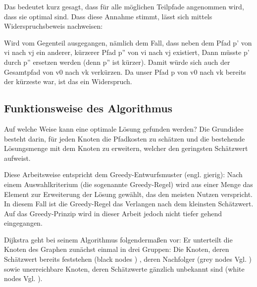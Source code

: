 \parindent0pt Das bedeutet kurz gesagt, dass  für alle möglichen Teilpfade angenommen wird, dass sie optimal sind.
Dass diese Annahme stimmt, lässt sich mittels Widerspruchsbeweis nachweisen: 

\parindent0pt Wird vom Gegenteil ausgegangen, nämlich dem Fall, dass neben dem Pfad p' von v{\tiny i} nach v{\tiny j} ein anderer, kürzerer Pfad p'' von v{\tiny i }nach v{\tiny j} existiert, Dann müsste p' durch p'' ersetzen werden (denn p'' ist kürzer). Damit würde sich auch der Gesamtpfad von v{\tiny 0} nach v{\tiny k} verkürzen. Da unser Pfad p von v{\tiny 0} nach v{\tiny k} bereits der kürzeste war, ist das  ein Widerspruch. 
\cite[S. 573, Z.1-5]{OttWid90}


\subsection{Funktionsweise des Algorithmus}
Auf welche Weise kann eine optimale Lösung gefunden werden?
Die Grundidee besteht darin, für jeden Knoten die Pfadkosten zu schätzen und die bestehende Lösungsmenge mit dem Knoten zu erweitern, welcher den geringsten Schätzwert aufweist. 

\parindent0pt Diese Arbeitsweise entspricht dem Greedy-Entwurfsmuster (engl. gierig): Nach einem Auswahlkriterium (die sogenannte Greedy-Regel) wird aus einer Menge das Element zur Erweiterung der Lösung gewählt, das den meisten Nutzen verspricht. In diesem Fall ist die Greedy-Regel das Verlangen nach dem kleinsten Schätzwert.
Auf das Greedy-Prinzip wird in dieser Arbeit jedoch nicht tiefer gehend eingegangen.

\parindent0pt Dijkstra geht bei seinem Algorithmus folgendermaßen vor: Er unterteilt die Knoten des Graphen zunächst einmal in drei Gruppen: Die Knoten, deren Schätzwert bereits feststehen (\glqq black nodes \grqq
\cite[S.107 Z.24]{Dijk88})
, deren Nachfolger (\glqq grey nodes \grqq
Vgl. \cite[S. 108, Z.2-3]{OttWid90})
 sowie unerreichbare Knoten, deren Schätzwerte gänzlich unbekannt sind (\glqq white nodes \grqq
Vgl. \cite[S. 108, Z.3]{OttWid90}).


